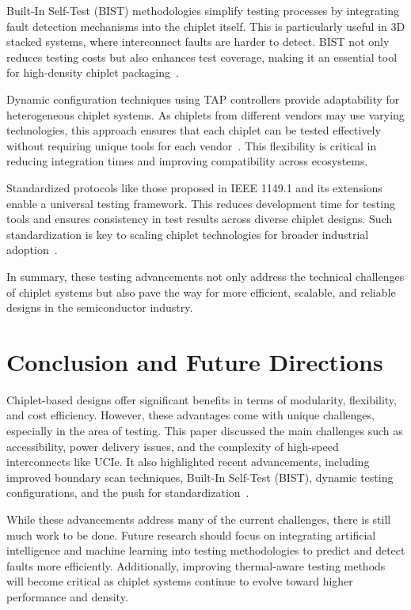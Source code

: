 \documentclass[acmtog, 12pt]{acmart}
\begin{document}
Built-In Self-Test (BIST) methodologies simplify testing processes by integrating fault detection mechanisms into the chiplet itself. This is particularly useful in 3D stacked systems, where interconnect faults are harder to detect. BIST not only reduces testing costs but also enhances test coverage, making it an essential tool for high-density chiplet packaging~\cite{10766679}.

Dynamic configuration techniques using TAP controllers provide adaptability for heterogeneous chiplet systems. As chiplets from different vendors may use varying technologies, this approach ensures that each chiplet can be tested effectively without requiring unique tools for each vendor~\cite{9824550}. This flexibility is critical in reducing integration times and improving compatibility across ecosystems.

Standardized protocols like those proposed in IEEE 1149.1 and its extensions enable a universal testing framework. This reduces development time for testing tools and ensures consistency in test results across diverse chiplet designs. Such standardization is key to scaling chiplet technologies for broader industrial adoption~\cite{6515989}.

In summary, these testing advancements not only address the technical challenges of chiplet systems but also pave the way for more efficient, scalable, and reliable designs in the semiconductor industry.


\section*{Conclusion and Future Directions}

Chiplet-based designs offer significant benefits in terms of modularity, flexibility, and cost efficiency. However, these advantages come with unique challenges, especially in the area of testing. This paper discussed the main challenges such as accessibility, power delivery issues, and the complexity of high-speed interconnects like UCIe. It also highlighted recent advancements, including improved boundary scan techniques, Built-In Self-Test (BIST), dynamic testing configurations, and the push for standardization~\cite{10365967, 10766679, 9824550, 6515989}.

While these advancements address many of the current challenges, there is still much work to be done. Future research should focus on integrating artificial intelligence and machine learning into testing methodologies to predict and detect faults more efficiently. Additionally, improving thermal-aware testing methods will become critical as chiplet systems continue to evolve toward higher performance and density.
\end{document}
